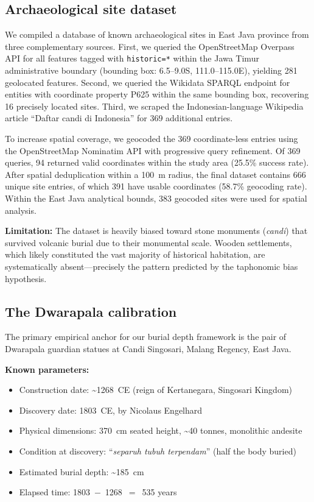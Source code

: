 \documentclass[12pt,a4paper]{article}
\begin{document}
\subsection{Archaeological site dataset}

We compiled a database of known archaeological sites in East Java province from three complementary sources. First, we queried the OpenStreetMap Overpass API for all features tagged with \texttt{historic=*} within the Jawa Timur administrative boundary (bounding box: 6.5--9.0\textdegree{}S, 111.0--115.0\textdegree{}E), yielding 281 geolocated features. Second, we queried the Wikidata SPARQL endpoint for entities with coordinate property P625 within the same bounding box, recovering 16 precisely located sites. Third, we scraped the Indonesian-language Wikipedia article ``Daftar candi di Indonesia'' for 369 additional entries.

To increase spatial coverage, we geocoded the 369 coordinate-less entries using the OpenStreetMap Nominatim API with progressive query refinement. Of 369 queries, 94 returned valid coordinates within the study area (25.5\% success rate). After spatial deduplication within a 100~m radius, the final dataset contains 666 unique site entries, of which 391 have usable coordinates (58.7\% geocoding rate). Within the East Java analytical bounds, 383 geocoded sites were used for spatial analysis.

\textbf{Limitation:} The dataset is heavily biased toward stone monuments (\textit{candi}) that survived volcanic burial due to their monumental scale. Wooden settlements, which likely constituted the vast majority of historical habitation, are systematically absent---precisely the pattern predicted by the taphonomic bias hypothesis.

\subsection{The Dwarapala calibration}

The primary empirical anchor for our burial depth framework is the pair of Dwarapala guardian statues at Candi Singosari, Malang Regency, East Java.

\textbf{Known parameters:}
\begin{itemize}
  \item Construction date: \textasciitilde1268~CE (reign of Kertanegara, Singosari Kingdom)
  \item Discovery date: 1803~CE, by Nicolaus Engelhard
  \item Physical dimensions: 370~cm seated height, \textasciitilde40 tonnes, monolithic andesite
  \item Condition at discovery: ``\textit{separuh tubuh terpendam}'' (half the body buried)
  \item Estimated burial depth: \textasciitilde185~cm
  \item Elapsed time: 1803~$-$~1268~$=$~535 years
\end{itemize}
\end{document}
